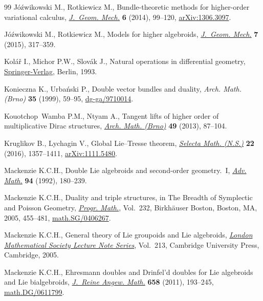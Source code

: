 \documentclass[pdftex]{sigma}
\numberwithin{equation}{section}
\theoremstyle{definition}
\begin{document}
\begin{thebibliography}{99}
J\'{o}\'{z}wikowski M., Rotkiewicz M., Bundle-theoretic methods for
 higher-order variational calculus, \href{https://doi.org/10.3934/jgm.2014.6.99}{\textit{J.~Geom. Mech.}} \textbf{6} (2014),
 99--120, \href{https://arxiv.org/abs/1306.3097}{arXiv:1306.3097}.

J\'{o}\'{z}wikowski M., Rotkiewicz M., Models for higher algebroids,
 \href{https://doi.org/10.3934/jgm.2015.7.317}{\textit{J.~Geom. Mech.}} \textbf{7} (2015), 317--359.

Kol\'{a}\v{r} I., Michor P.W., Slov\'{a}k J., Natural operations in
 differential geometry, \href{https://doi.org/10.1007/978-3-662-02950-3}{Springer-Verlag}, Berlin, 1993.

Konieczna K., Urba\'{n}ski P., Double vector bundles and duality, \textit{Arch.
 Math. (Brno)} \textbf{35} (1999), 59--95, \href{https://arxiv.org/abs/dg-ga/9710014}{dg-ga/9710014}.

Kouotchop~Wamba P.M., Ntyam A., Tangent lifts of higher order of multiplicative
 {D}irac structures, \href{https://doi.org/10.5817/AM2013-2-87}{\textit{Arch. Math. (Brno)}} \textbf{49} (2013), 87--104.

Kruglikov B., Lychagin V., Global {L}ie--{T}resse theorem, \href{https://doi.org/10.1007/s00029-015-0220-z}{\textit{Selecta
 Math. (N.S.)}} \textbf{22} (2016), 1357--1411, \href{https://arxiv.org/abs/1111.5480}{arXiv:1111.5480}.

Mackenzie K.C.H., Double {L}ie algebroids and second-order geometry.~{I},
 \href{https://doi.org/10.1016/0001-8708(92)90036-K}{\textit{Adv. Math.}} \textbf{94} (1992), 180--239.

Mackenzie K.C.H., Duality and triple structures, in The Breadth of Symplectic
 and {P}oisson Geometry, \href{https://doi.org/10.1007/0-8176-4419-9_15}{\textit{Progr. Math.}}, Vol.~232, Birkh\"{a}user
 Boston, Boston, MA, 2005, 455--481, \href{https://arxiv.org/abs/math.SG/0406267}{math.SG/0406267}.

Mackenzie K.C.H., General theory of {L}ie groupoids and {L}ie algebroids,
 \href{https://doi.org/10.1017/CBO9781107325883}{\textit{London Mathematical Society Lecture Note Series}}, Vol.~213, Cambridge
 University Press, Cambridge, 2005.

Mackenzie K.C.H., Ehresmann doubles and {D}rinfel'd doubles for {L}ie
 algebroids and {L}ie bialgebroids, \href{https://doi.org/10.1515/CRELLE.2011.092}{\textit{J.~Reine Angew. Math.}}
 \textbf{658} (2011), 193--245, \href{https://arxiv.org/abs/math.DG/0611799}{math.DG/0611799}.


\end{thebibliography}
\end{document}
